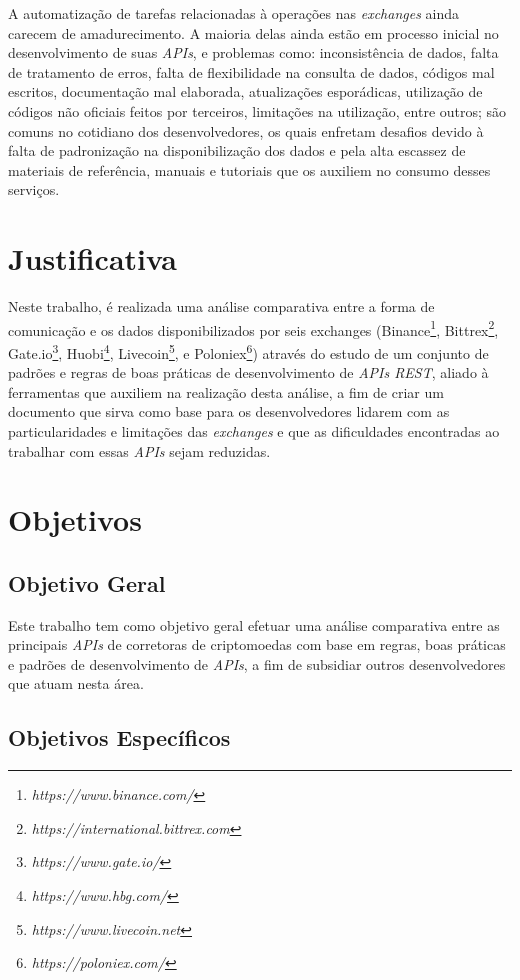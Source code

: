 A automatização de tarefas relacionadas à operações nas \textit{exchanges} ainda carecem de amadurecimento. A maioria delas ainda estão em processo inicial no desenvolvimento de suas \textit{APIs}, e problemas como: inconsistência de dados, falta de tratamento de erros, falta de flexibilidade na consulta de dados, códigos mal escritos, documentação mal elaborada, atualizações esporádicas, utilização de códigos não oficiais feitos por terceiros, limitações na utilização, entre outros; são comuns no cotidiano dos desenvolvedores, os quais enfretam desafios devido à falta de padronização na disponibilização dos dados e pela alta escassez de materiais de referência, manuais e tutoriais que os auxiliem no consumo desses serviços.

\section{Justificativa}

Neste trabalho, é realizada uma análise comparativa entre a forma de comunicação e os dados disponibilizados por seis exchanges (Binance\footnote{\em https://www.binance.com/}, Bittrex\footnote{\em https://international.bittrex.com}, Gate.io\footnote{\em https://www.gate.io/}, Huobi\footnote{\em https://www.hbg.com/}, Livecoin\footnote{\em https://www.livecoin.net}, e Poloniex\footnote{\em https://poloniex.com/}) através do estudo de um conjunto de padrões e regras de boas práticas de desenvolvimento de \textit{APIs REST}, aliado à ferramentas que auxiliem na realização desta análise, a fim de criar um documento que sirva como base para os desenvolvedores lidarem com as particularidades e limitações das \textit{exchanges} e que as dificuldades encontradas ao trabalhar com essas \textit{APIs} sejam reduzidas.
\section{Objetivos}

\subsection{Objetivo Geral}

Este trabalho tem como objetivo geral efetuar uma análise comparativa entre as principais \textit{APIs} de corretoras de criptomoedas
com base em regras, boas práticas e padrões de desenvolvimento de \textit{APIs}, a fim de subsidiar outros desenvolvedores que atuam nesta área.

\subsection{Objetivos Específicos}

